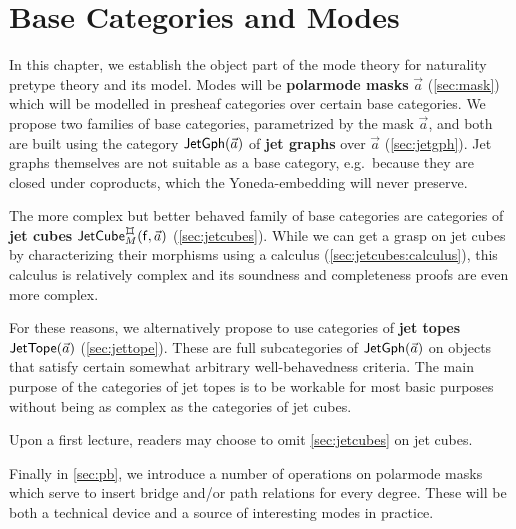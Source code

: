 \documentclass[a4paper]{memoir}
\begin{document}

\chapter{Base Categories and Modes} \label{ch:modes}
In this chapter, we establish the object part of the mode theory for naturality pretype theory and its model.
Modes will be \textbf{polarmode masks} $\vec a$ (\cref{sec:mask}) which will be modelled in presheaf categories over certain base categories.
We propose two families of base categories, parametrized by the mask $\vec a$, and both are built using the category $\mathsf{JetGph}(\vec a)$ of \textbf{jet graphs} over $\vec a$ (\cref{sec:jetgph}).
Jet graphs themselves are not suitable as a base category, e.g.\ because they are closed under coproducts, which the Yoneda-embedding will never preserve.

The more complex but better behaved family of base categories are categories of \textbf{jet cubes} $\jetcubefwd \mycubex M {\vec a}$ (\cref{sec:jetcubes}).
While we can get a grasp on jet cubes by characterizing their morphisms using a calculus (\cref{sec:jetcubes:calculus}), this calculus is relatively complex and its soundness and completeness proofs are even more complex.

For these reasons, we alternatively propose to use categories of \textbf{jet topes} $\mathsf{JetTope}(\vec a)$ (\cref{sec:jettope}). These are full subcategories of $\mathsf{JetGph}(\vec a)$ on objects that satisfy certain somewhat arbitrary well-behavedness criteria.
The main purpose of the categories of jet topes is to be workable for most basic purposes without being as complex as the categories of jet cubes.

Upon a first lecture, readers may choose to omit \cref{sec:jetcubes} on jet cubes.

Finally in \cref{sec:pb}, we introduce a number of operations on polarmode masks which serve to insert bridge and/or path relations for every degree.
These will be both a technical device and a source of interesting modes in practice. 
\end{document}
